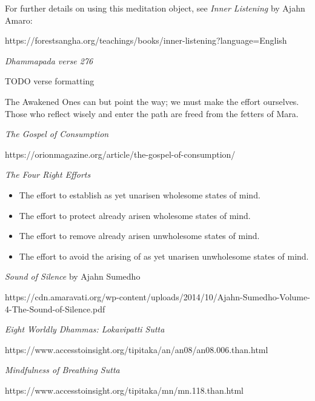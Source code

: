 For further details on using this meditation object, see \emph{Inner Listening} by Ajahn Amaro:

https://forestsangha.org/teachings/books/inner-listening?language=English

 \emph{Dhammapada verse 276}

TODO verse formatting

The Awakened Ones can but point the way; we must make the effort ourselves.
Those who reflect wisely and enter the path are freed from the fetters of Mara.

 \emph{The Gospel of Consumption}

https://orionmagazine.org/article/the-gospel-of-consumption/

 \emph{The Four Right Efforts}

\begin{itemize}
\item The effort to establish as yet unarisen wholesome states of mind.
\item The effort to protect already arisen wholesome states of mind.
\item The effort to remove already arisen unwholesome states of mind.
\item The effort to avoid the arising of as yet unarisen unwholesome states of mind.
\end{itemize}

 \emph{Sound of Silence} by Ajahn Sumedho

https://cdn.amaravati.org/wp-content/uploads/2014/10/Ajahn-Sumedho-Volume-4-The-Sound-of-Silence.pdf

 \emph{Eight Worldly Dhammas: Lokavipatti Sutta}

https://www.accesstoinsight.org/tipitaka/an/an08/an08.006.than.html

 \emph{Mindfulness of Breathing Sutta}

https://www.accesstoinsight.org/tipitaka/mn/mn.118.than.html

